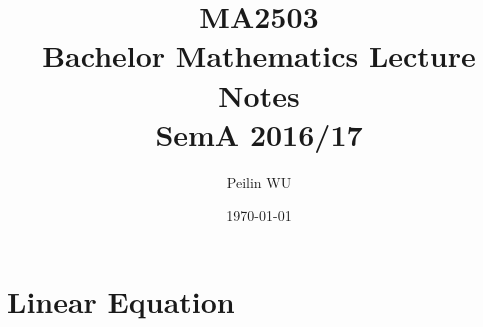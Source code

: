 \documentclass[10.5pt]{article}
\begin{document}
 
\title{MA2503 \\ Bachelor Mathematics Lecture Notes\\
SemA 2016/17}
\author{Peilin \textsc{WU}
} 
\date{\today}


\maketitle
\tableofcontents

\newpage
\section{Linear Equation}
\end{document}
